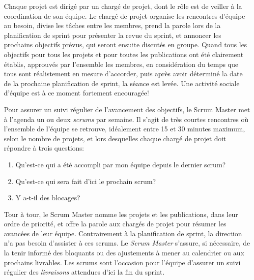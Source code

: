\documentclass[
  letterpaper,
  DIV=11,
  numbers=noendperiod,
  oneside]{scrreprt}
\providecommand{\tightlist}{%
  \setlength{\itemsep}{0pt}\setlength{\parskip}{0pt}}\usepackage{longtable,booktabs,array}
\begin{document}
Chaque projet est dirigé par un chargé de projet, dont le rôle est de
veiller à la coordination de son équipe. Le chargé de projet organise
les rencontres d'équipe au besoin, divise les tâches entre les membres,
prend la parole lors de la planification de sprint pour présenter la
revue du sprint, et annoncer les prochains objectifs prévus, qui seront
ensuite discutés en groupe. Quand tous les objectifs pour tous les
projets et pour toutes les publications ont été clairement établis,
approuvés par l'ensemble les membres, en considération du temps que tous
sont réalistement en mesure d'accorder, puis après avoir déterminé la
date de la prochaine planification de sprint, la séance est levée. Une
activité sociale d'équipe est à ce moment fortement encouragée!

Pour assurer un suivi régulier de l'avancement des objectifs, le Scrum
Master met à l'agenda un ou deux \emph{scrums} par semaine. Il s'agit de
très courtes rencontres où l'ensemble de l'équipe se retrouve,
idéalement entre 15 et 30 minutes maximum, selon le nombre de projets,
et lors desquelles chaque chargé de projet doit répondre à trois
questions:

\begin{enumerate}
\def\labelenumi{\arabic{enumi}.}
\tightlist
\item
  Qu'est-ce qui a été accompli par mon équipe depuis le dernier scrum?
\item
  Qu'est-ce qui sera fait d'ici le prochain scrum?
\item
  Y a-t-il des blocages?
\end{enumerate}

Tour à tour, le Scrum Master nomme les projets et les publications, dans
leur ordre de priorité, et offre la parole aux chargés de projet pour
résumer les avancées de leur équipe. Contrairement à la planification de
sprint, la direction n'a pas besoin d'assister à ces scrums. Le
\emph{Scrum Master} s'assure, si nécessaire, de la tenir informé des
bloquants ou des ajustements à mener au calendrier ou aux prochains
livrables. Les scrums sont l'occasion pour l'équipe d'assurer un suivi
régulier des \emph{livraisons} attendues d'ici la fin du sprint.
\end{document}
